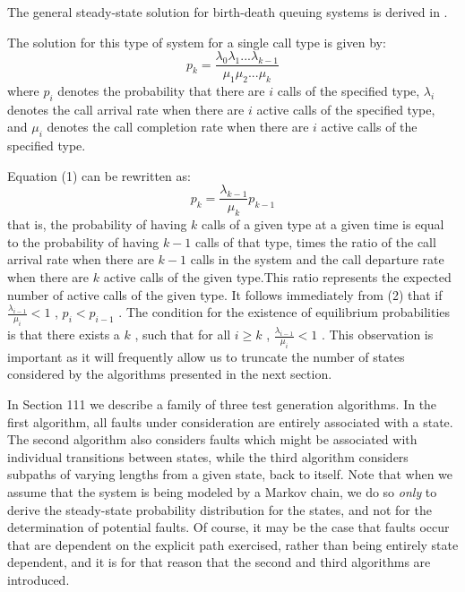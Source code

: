 \documentclass[journal, twoside]{IEEEtran}
\begin{document}
The general steady-state solution for birth-death queuing
systems is derived in \cite{b5}. 

The solution for this type of system for a single call type is given by: 
\begin{equation}
    p_k = \frac{\lambda_0\lambda_1...\lambda_{k-1}}{\mu_1\mu_2...\mu_k}
\end{equation}
where \(p_i\) denotes the probability that there are \(i\) calls of the specified type, \(\lambda_i\) denotes the call arrival rate when there are \(i\) active calls of the specified type, and \(\mu_i\) denotes the call
completion rate when there are \(i\) active calls of the specified type.

Equation (1) can be rewritten as: 
\begin{equation}
    p_k=\frac{\lambda_{k-1} }{\mu_k} p_{k-1}
\end{equation}
that is, the probability of having \(k\)  calls of a given type at a given time is equal to the probability of having \(k - 1\) calls of that type, times the ratio of the call arrival rate when there are \(k - 1\) calls in the system and the call departure rate when there are \(k\) active calls of the given type.This ratio represents the
expected number of active calls of the given type. It follows
immediately from (2) that if  $ \frac{\lambda_{i-1}}{\mu_i}<1 $   , $  p_i < p_{i-1} $ . The condition for the existence of equilibrium probabilities is that
there exists a $k$ , such that for all   $ i \geq k $ , $ \frac{\lambda_{i-1}}{\mu_i}<1 $ . This observation is important as it will frequently allow us to truncate the
number of states considered by the algorithms presented in the next section.

In Section 111 we describe a family of three test generation
algorithms. In the first algorithm, all faults under consideration
are entirely associated with a state. The second algorithm also
considers faults which might be associated with individual
transitions between states, while the third algorithm considers
subpaths of varying lengths from a given state, back to itself.
Note that when we assume that the system is being modeled by
a Markov chain, we do so \textit{only} to derive the steady-state probability distribution for the states, and not for the determination
of potential faults. Of course, it may be the case that faults
occur that are dependent on the explicit path exercised, rather
than being entirely state dependent, and it is for that reason
that the second and third algorithms are introduced.
\end{document}
